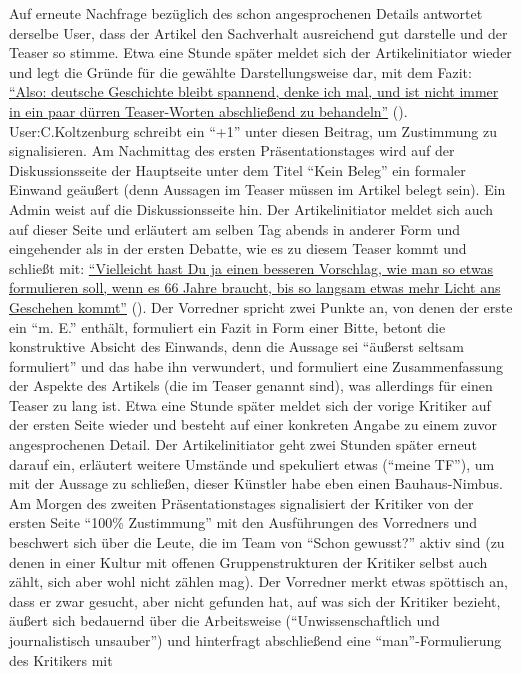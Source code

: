\documentclass[fontsize=12pt]{scrartcl}
\begin{document}
Auf erneute Nachfrage bez\"uglich des schon an\-ge\-spro\-chenen Details antwortet derselbe User, dass der Artikel den Sachverhalt aus\-rei\-chend gut darstelle und der Teaser so stimme. Etwa eine Stunde sp\"ater meldet sich der Artikelinitiator\textsuperscript{\tiny *} wieder und legt die Gr\"unde f\"ur die gew\"ahlte Darstellungsweise dar, mit dem Fazit: \href{https://de.wikipedia.org/w/index.php?title=Wikipedia_Diskussion:Hauptseite/Schon_gewusst&diff=prev&oldid=138107562}{"`Also: deutsche Geschichte bleibt spannend, denke ich mal, und ist nicht immer in ein paar d\"urren Teaser-Worten abschlie{\ss}end zu behandeln"'} (\cite{UserGoesseln2015a}). \mbox{User}:C.Kolt\-zen\-burg schreibt ein "`+1"' unter diesen Beitrag, um Zustimmung zu sig\-na\-li\-sieren. Am Nachmittag des ersten Pr\"asentationstages wird auf der Dis\-kus\-si\-onsseite der Hauptseite unter dem Titel "`Kein Beleg"' ein formaler Einwand ge\"au{\ss}ert (denn Aussagen im Teaser m\"ussen im Artikel belegt sein). Ein Admin weist auf die Dis\-kus\-si\-onsseite hin. Der Artikelinitiator\textsuperscript{\tiny *} meldet sich auch auf dieser Seite und erl\"autert am selben Tag abends in an\-de\-rer Form und eingehender als in der ersten Debatte, wie es zu diesem Teaser kommt und schlie{\ss}t mit: \href{https://de.wikipedia.org/w/index.php?title=Wikipedia_Diskussion:Hauptseite&diff=prev&oldid=138120673}{"`Vielleicht hast Du ja einen besseren Vorschlag, wie man so etwas formulieren soll, wenn es 66 Jahre braucht, bis so langsam etwas mehr Licht ans Geschehen kommt"'} (\cite{UserGoesseln2015b}). Der Vorredner\textsuperscript{\tiny *} spricht zwei Punkte an, von denen der erste ein "`m. E."' enth\"alt, formuliert ein Fazit in Form einer Bitte, betont die konstruktive Absicht des Einwands, denn die Aussage sei "`\"au{\ss}erst seltsam formuliert"' und das habe ihn\textsuperscript{\tiny *} verwundert, und formuliert eine Zusammenfassung der Aspekte des Artikels (die im Teaser genannt sind), was al\-ler\-dings f\"ur einen Teaser zu lang ist. Etwa eine Stunde sp\"ater meldet sich der vorige Kritiker\textsuperscript{\tiny *} auf der ersten Seite wieder und be\-steht auf einer konkreten Angabe zu einem zuvor an\-ge\-spro\-chenen Detail. Der Artikelinitiator\textsuperscript{\tiny *} geht zwei Stunden sp\"ater erneut darauf ein, erl\"autert weitere Umst\"ande und spekuliert etwas ("`meine TF"'), um mit der Aussage zu schlie{\ss}en, dieser K\"unstler habe eben einen Bauhaus-Nimbus. Am Morgen des zwei\-ten Pr\"asentationstages sig\-na\-li\-siert der Kritiker\textsuperscript{\tiny *} von der ersten Seite "`100\% Zustimmung"' mit den Ausf\"uh\-rungen des Vorredners\textsuperscript{\tiny *} und beschwert sich \"uber die Leute, die im Team von "`Schon gewusst?"' aktiv sind (zu denen in einer Kultur mit offenen Gruppenstrukturen der Kritiker\textsuperscript{\tiny *} \mbox{selbst} auch z\"ahlt, sich aber wohl nicht z\"ahlen mag). Der Vorredner\textsuperscript{\tiny *} merkt etwas sp\"ottisch an, dass er\textsuperscript{\tiny *} zwar gesucht, aber nicht gefunden hat, auf was sich der Kritiker\textsuperscript{\tiny *} bezieht, \"au{\ss}ert sich bedauernd \"uber die Arbeitsweise ("`Unwissenschaftlich und journalistisch unsauber"') und hinterfragt abschlie{\ss}end eine "`man"'-Formulierung des Kritikers\textsuperscript{\tiny *} mit 
\end{document}
